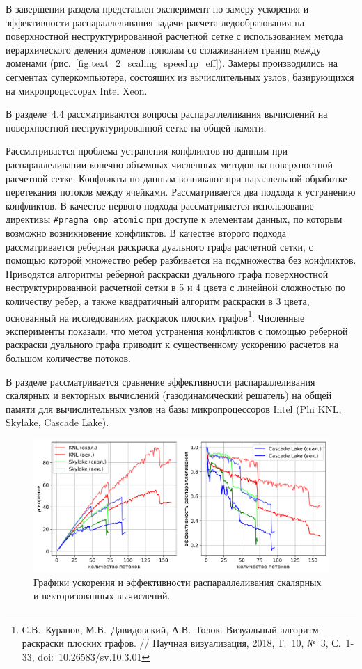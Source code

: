 \documentclass[a4paper,14pt]{extarticle}                     %
\theoremstyle{plain}                                         %
\begin{document}
В завершении раздела представлен эксперимент по замеру ускорения и эффективности распараллеливания задачи расчета ледообразования на поверхностной неструктурированной расчетной сетке с использованием метода иерархического деления доменов пополам со сглаживанием границ между доменами (рис.~\ref{fig:text_2_scaling_speedup_eff}).
Замеры производились на сегментах суперкомпьютера, состоящих из вычислительных узлов, базирующихся на микропроцессорах Intel Xeon.


В разделе~4.4 рассматриваются вопросы распараллеливания вычислений на поверхностной неструктурированной сетке на общей памяти.

Рассматривается проблема устранения конфликтов по данным при распараллеливании конечно-объемных численных методов на поверхностной расчетной сетке.
Конфликты по данным возникают при параллельной обработке перетекания потоков между ячейками.
Рассматривается два подхода к устранению конфликтов.
В качестве первого подхода рассматривается использование директивы \texttt{\#pragma omp atomic} при доступе к элементам данных, по которым возможно возникновение конфликтов.
В качестве второго подхода рассматривается реберная раскраска дуального графа расчетной сетки, с помощью которой множество ребер разбивается на подмножества без конфликтов.
Приводятся алгоритмы реберной раскраски дуального графа поверхностной неструктурированной расчетной сетки в 5 и 4 цвета с линейной сложностью по количеству ребер, а также квадратичный алгоритм раскраски в 3 цвета, основанный на исследованиях раскрасок плоских графов\footnote[2]{С.В.~Курапов, М.В.~Давидовский, А.В.~Толок. Визуальный алгоритм раскраски плоских графов. // Научная визуализация, 2018, Т.~10, №~3, С.~1-33, doi:~10.26583/sv.10.3.01}.
Численные эксперименты показали, что метод устранения конфликтов с помощью реберной раскраски дуального графа приводит к существенному ускорению расчетов на большом количестве потоков.

В разделе рассматривается сравнение эффективности распараллеливания скалярных и векторных вычислений (газодинамический решатель) на общей памяти для вычислительных узлов на базы микропроцессоров Intel (Phi KNL, Skylake, Cascade Lake).

\begin{figure}[ht]
\centering
\includegraphics[width=1.0\textwidth]{./fig/par_openmp_scalar_vec_chart_big.png}
\singlespacing
\caption{Графики ускорения и эффективности распараллеливания скалярных и векторизованных вычислений.}
\label{fig:text_3_omp2}
\end{figure}
\end{document}
